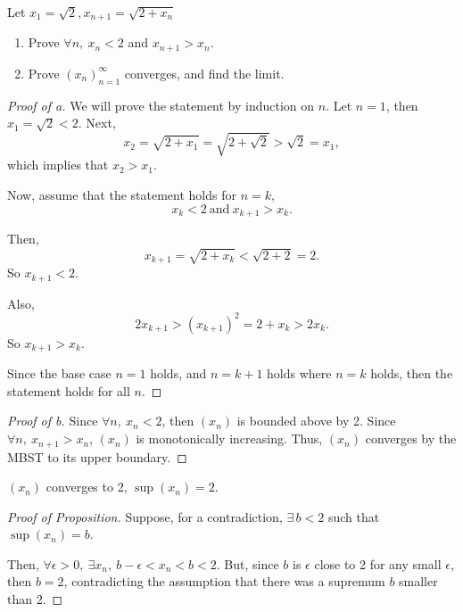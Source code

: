 \documentclass[../hw2]{subfiles}
\begin{document}
\begin{problem}[4]
Let $x_1=\sqrt{2},x_{n+1}=\sqrt{2+x_{n}}$

\begin{enumerate}[label=\alph*]
	\item Prove $\forall n, \ x_n<2$ and $x_{n+1}>x_{n}$.
	\item Prove ${(x_{n})}_{n=1}^{\infty}$ converges, and find the limit.
\end{enumerate}
\end{problem}
\begin{proof}[Proof of a]
	We will prove the statement by induction on $n$. Let  $n=1$, then  $x_1=\sqrt{2} < 2 $. Next, \[
		x_2=\sqrt{2+x_1}=\sqrt{2+\sqrt{2} }>\sqrt{2}=x_1
		,\] which implies that $x_2>x_1$.

	Now, assume that the statement holds for $n=k$,\[
		x_k<2\ \text{and}\ x_{k+1}>x_k
		.\]

	Then, \[
		x_{k+1}=\sqrt{2+x_k}<\sqrt{2+2}=2
		.\] So $x_{k+1}<2$.

	Also, \[
		2x_{k+1}>{(x_{k+1})}^2=2+x_k>2x_k
		.\] So $x_{k+1}>x_k$.

	Since the base case $n=1$ holds, and  $n=k+1$ holds where  $n=k$ holds, then the statement holds for all  $n$.
\end{proof}
\begin{proof}[Proof of b]
	Since $\forall n,\ x_n<2$, then $(x_n)$ is bounded above by 2. Since  $\forall n,\ x_{n+1}>x_n$, $(x_n)$ is monotonically increasing. Thus,  $(x_{n})$ converges by the MBST to its upper boundary.
\end{proof}
\begin{proposition}
	$(x_n)$ converges to 2, $\sup(x_n)=2$.
\end{proposition}
\begin{proof}[Proof of Proposition]
	Suppose, for a contradiction, $\exists\, b < 2$ such that $\sup(x_n)=b$.

	Then, $\forall \epsilon>0,\ \exists x_n,\ b-\epsilon<x_n<b<2$. But, since $b$ is  $\epsilon$ close to 2 for any small  $\epsilon$, then  $b=2$, contradicting the assumption that there was a supremum $b$ smaller than 2.
\end{proof}
\end{document}
